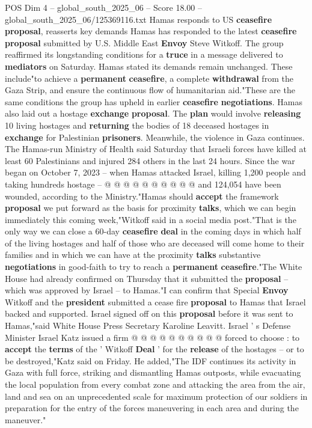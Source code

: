 \begin{textsample}{POS Dim 4 – global\_south\_2025\_06 – Score 18.00 – global\_south\_2025\_06/125369116.txt}  \label{ex:f4_pos_358}
Hamas responds to US \textbf{ceasefire} \textbf{proposal}, reasserts key demands Hamas has responded to the latest \textbf{ceasefire} \textbf{proposal} submitted by U.S.
Middle East \textbf{Envoy} Steve Witkoff.
The group reaffirmed its longstanding conditions for a \textbf{truce} in a message delivered to \textbf{mediators} on Saturday.
Hamas stated its demands remain unchanged.
These include"to achieve a \textbf{permanent} \textbf{ceasefire}, a complete \textbf{withdrawal} from the Gaza Strip, and ensure the continuous flow of humanitarian aid."These are the same conditions the group has upheld in earlier \textbf{ceasefire} \textbf{negotiations}.
Hamas also laid out a hostage \textbf{exchange} \textbf{proposal}.
The \textbf{plan} would involve \textbf{releasing} 10 living hostages and \textbf{returning} the bodies of 18 deceased hostages in \textbf{exchange} for Palestinian \textbf{prisoners}.
Meanwhile, the violence in Gaza continues.
The Hamas-run Ministry of Health said Saturday that Israeli forces have killed at least 60 Palestinians and injured 284 others in the last 24 hours.
Since the war began on October 7, 2023 -- when Hamas attacked Israel, killing 1,200 people and taking hundreds hostage -- @ @ @ @ @ @ @ @ @ @ and 124,054 have been wounded, according to the Ministry."Hamas should \textbf{accept} the framework \textbf{proposal} we put forward as the basis for proximity \textbf{talks}, which we can begin immediately this coming week,"Witkoff said in a social media post."That is the only way we can close a 60-day \textbf{ceasefire} \textbf{deal} in the coming days in which half of the living hostages and half of those who are deceased will come home to their families and in which we can have at the proximity \textbf{talks} substantive \textbf{negotiations} in good-faith to try to reach a \textbf{permanent} \textbf{ceasefire}."The White House had already confirmed on Thursday that it submitted the \textbf{proposal} -- which was approved by Israel -- to Hamas."I can confirm that Special \textbf{Envoy} Witkoff and the \textbf{president} submitted a cease fire \textbf{proposal} to Hamas that Israel backed and supported.
Israel signed off on this \textbf{proposal} before it was sent to Hamas,"said White House Press Secretary Karoline Leavitt.
Israel ' s Defense Minister Israel Katz issued a firm @ @ @ @ @ @ @ @ @ @ forced to choose : to \textbf{accept} the \textbf{terms} of the ' Witkoff \textbf{Deal} ' for the \textbf{release} of the hostages -- or to be destroyed,"Katz said on Friday.
He added,"The IDF continues its activity in Gaza with full force, striking and dismantling Hamas outposts, while evacuating the local population from every combat zone and attacking the area from the air, land and sea on an unprecedented scale for maximum protection of our soldiers in preparation for the entry of the forces maneuvering in each area and during the maneuver."

\end{textsample}
